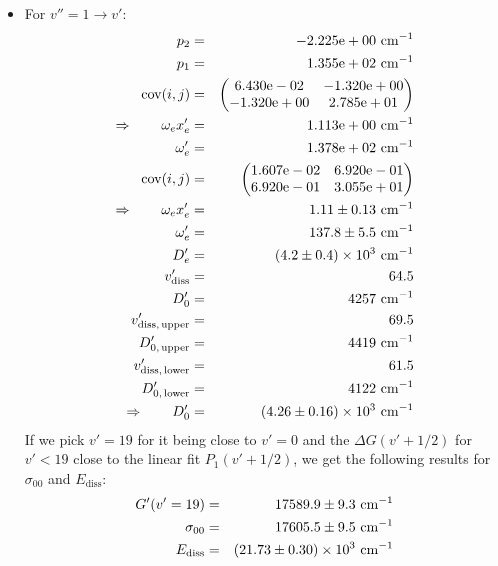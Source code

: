 \begin{itemize}
    \item For $v'' = 1 \rightarrow v'$:
        \begin{eqnarray}
            p_2 &=& -2.225\mathrm{e}+00 \ \mathrm{cm^{-1}} \nonumber \\
            p_1 &=& 1.355\mathrm{e}+02 \ \mathrm{cm^{-1}} \nonumber \\
            \mathrm{cov}(i, j) &=& 
            \begin{pmatrix}
                6.430\mathrm{e}-02 &-1.320\mathrm{e}+00 \\
                -1.320\mathrm{e}+00 &2.785\mathrm{e}+01 \\
            \end{pmatrix}
            \\ \Rightarrow \qquad
            \omega_e x_e' &=& 1.113\mathrm{e}+00 \ \mathrm{cm^{-1}} \nonumber \\
            \omega_e' &=& 1.378\mathrm{e}+02 \ \mathrm{cm^{-1}} \nonumber \\
            \mathrm{cov}(i, j) &=& 
            \begin{pmatrix}
                1.607\mathrm{e}-02 &6.920\mathrm{e}-01 \\
                6.920\mathrm{e}-01 &3.055\mathrm{e}+01 \\
            \end{pmatrix}
            \\ \Rightarrow \qquad
            \omega_e x_e' &=& 1.11 \pm 0.13 \ \mathrm{cm^{-1}}\\
            \omega_e' &=& 137.8 \pm 5.5 \ \mathrm{cm^{-1}} \\
            D_e' &=& \left(4.2 \pm 0.4\right) \times 10^{3} \ \mathrm{cm^{-1}} \\
            v_\mathrm{diss}' &=& 64.5 \\
            D_0' &=& 4257 \ \mathrm{cm^{-1}} \\
            v_\mathrm{diss,\, upper}' &=& 69.5 \\
            D_{0,\, \mathrm{upper}}' &=& 4419 \ \mathrm{cm^{-1}}\\
            v_\mathrm{diss,\, lower}' &=& 61.5 \\
            D_{0,\, \mathrm{lower}}' &=& 4122 \ \mathrm{cm^{-1}} \\
            \Rightarrow \qquad
            D_0' &=& \left(4.26 \pm 0.16\right) \times 10^{3} \ \mathrm{cm^{-1}}
        \end{eqnarray}
        If we pick $v' = 19$ for it being close to $v' = 0$ and the $\Delta G(v' + 1/2)$ 
        for $v' < 19$ close to the linear fit $P_1(v' + 1/2)$, we get the following results for 
        $\sigma_{00}$ and $E_\mathrm{diss}$:
        \begin{eqnarray}
            G'(v' = 19) &=& 17589.9 \pm 9.3 \ \mathrm{cm^{-1}} \\
            \sigma_{00} &=& 17605.5 \pm 9.5 \ \mathrm{cm^{-1}} \\
            E_\mathrm{diss} &=& \left(21.73 \pm 0.30\right) \times 10^{3} \ \mathrm{cm^{-1}}
        \end{eqnarray}
    \end{itemize}
